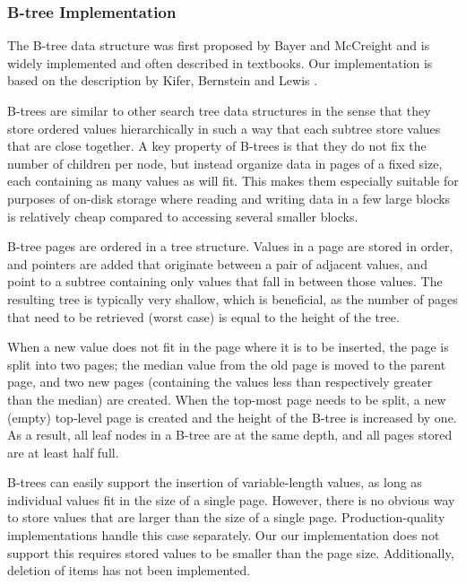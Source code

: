\documentclass{acm_proc_article-sp}
\begin{document}
\subsubsection{B-tree Implementation}
The B-tree data structure was first proposed by Bayer and McCreight
\cite{bayer1970oam} and is widely implemented and often described in
textbooks. Our implementation is based on the description by Kifer, Bernstein
and Lewis \cite{kifer2006dsa}.

B-trees are similar to other search tree data structures in the sense that
they store ordered values hierarchically in such a way that each subtree store
values that are close together.
A key property of B-trees is that they do not fix the number of children per node, but instead organize data in pages of a fixed size, each containing
as many values as will fit. This makes them especially suitable for purposes
of on-disk storage where reading and writing data in a few large blocks is
relatively cheap compared to accessing several smaller blocks.

B-tree pages are ordered in a tree structure. Values in a page are stored
in order, and pointers are added that originate between a pair of adjacent
values, and point to a subtree containing only values that fall in between those
values. The resulting tree is typically very shallow, which is beneficial,
as the number of pages that need to be retrieved (worst case) is equal to
the height of the tree.

When a new value does not fit in the page where it is to be inserted,
the page is split into two pages; the median value from the old page is
moved to the parent page, and two new pages (containing the values less
than respectively greater than the median) are created. When the top-most
page needs to be split, a new (empty) top-level page is created and the height
of the B-tree is increased by one. As a result, all leaf nodes in a B-tree are
at the same depth, and all pages stored are at least half full.


B-trees can easily support the insertion of variable-length values, as long
as individual values fit in the size of a single page. However, there is no
obvious way to store values that are larger than the size of a single page.
Production-quality implementations handle this case separately. Our our
implementation does not support this requires stored values to
be smaller than the page size. Additionally, deletion of items has not been
implemented.
\end{document}
